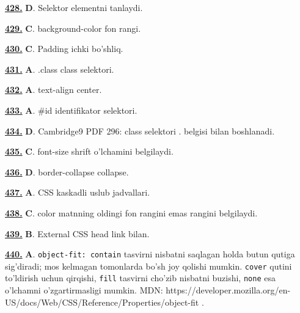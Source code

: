 \documentclass[10pt,a4paper,oneside]{article}
\begin{document}
\noindent\hyperlink{q428}{\textbf{428.}} \textbf{D}.  Selektor elementni tanlaydi.
\par\vspace{3mm}
\noindent\hyperlink{q429}{\textbf{429.}} \textbf{C}.  background-color fon rangi.
\par\vspace{3mm}
\noindent\hyperlink{q430}{\textbf{430.}} \textbf{C}.  Padding ichki bo'shliq.
\par\vspace{3mm}
\noindent\hyperlink{q431}{\textbf{431.}} \textbf{A}.  .class class selektori.
\par\vspace{3mm}
\noindent\hyperlink{q432}{\textbf{432.}} \textbf{A}.  text-align center.
\par\vspace{3mm}
\noindent\hyperlink{q433}{\textbf{433.}} \textbf{A}.  \#id identifikator selektori.
\par\vspace{3mm}
\noindent\hyperlink{q434}{\textbf{434.}} \textbf{D}.  Cambridge9 PDF 296: class selektori . belgisi bilan boshlanadi.
\par\vspace{3mm}
\noindent\hyperlink{q435}{\textbf{435.}} \textbf{C}.  font-size shrift o'lchamini belgilaydi.
\par\vspace{3mm}
\noindent\hyperlink{q436}{\textbf{436.}} \textbf{D}.  border-collapse collapse.
\par\vspace{3mm}
\noindent\hyperlink{q437}{\textbf{437.}} \textbf{A}.  CSS kaskadli uslub jadvallari.
\par\vspace{3mm}
\noindent\hyperlink{q438}{\textbf{438.}} \textbf{C}.  color matnning oldingi fon rangini emas rangini belgilaydi.
\par\vspace{3mm}
\noindent\hyperlink{q439}{\textbf{439.}} \textbf{B}.  External CSS head link bilan.
\par\vspace{3mm}
\noindent\hyperlink{q440}{\textbf{440.}} \textbf{A}.  \texttt{object-fit: contain} tasvirni nisbatni saqlagan holda butun qutiga sig'diradi; mos kelmagan tomonlarda bo'sh joy qolishi mumkin. \texttt{cover} qutini to'ldirish uchun qirqishi, \texttt{fill} tasvirni cho'zib nisbatni buzishi, \texttt{none} esa o'lchamni o'zgartirmasligi mumkin. MDN: https://developer.mozilla.org/en-US/docs/Web/CSS/Reference/Properties/object-fit .
\end{document}
